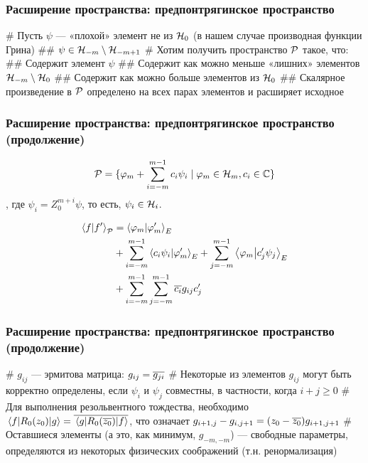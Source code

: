 \documentclass{beamer}
\begin{document}
\begin{frame}[fragile]
\frametitle{Расширение пространства: предпонтрягинское пространство}
\begin{easylist}[itemize]
# Пусть $\psi$ — «плохой» элемент не из $\mathcal{H}_{0}$ (в нашем случае производная функции Грина)
## $\psi \in \mathcal{H}_{-m} \setminus \mathcal{H}_{-m + 1}$ 
# Хотим получить пространство $\mathcal{P}$ такое, что:
## Содержит элемент $\psi$
## Содержит как можно меньше «лишних» элементов $\mathcal{H}_{-m} \setminus \mathcal{H}_{0}$
## Содержит как можно больше элементов из $\mathcal{H}_{0}$
## Скалярное произведение в $\mathcal{P}$ определено на всех парах элементов и расширяет исходное
\end{easylist}
\end{frame}


\begin{frame}[fragile]
\frametitle{Расширение пространства: предпонтрягинское пространство (продолжение)}
\[
\mathcal{P} = 
\{ \varphi_m + \sum\limits_{i = -m}^{m - 1} c_i \psi_i \mid \varphi_m \in \mathcal{H}_{m}, c_i \in \mathbb{C}\}
\]
, где $\psi_i = Z_0^{m + i} \psi$, то есть, $\psi_i \in \mathcal{H}_{i}$.

\begin{align*}
\ip{f}{f'}_{\mcP}
&= \ip{\varphi_m}{\varphi'_m}_E \\
&+ \sum\limits_{i = -m}^{m - 1} \ip{c_i \psi_i}{\varphi'_m}_E + \sum\limits_{j = -m}^{m - 1} \ip{\varphi_m}{c_j' \psi_j}_E \\
&+ \sum\limits_{i = -m}^{m - 1} \sum\limits_{j = -m}^{m - 1} \cconj{c_i} g_{ij} c_j'
\end{align*}
\end{frame}


\begin{frame}[fragile]
\frametitle{Расширение пространства: предпонтрягинское пространство (продолжение)}
\begin{easylist}[itemize]
# $g_{ij}$ — эрмитова матрица: $g_{ij} = \overline{g_{ji}}$
# Некоторые из элементов $g_{ij}$ могут быть корректно определены, если $\psi_i$ и $\psi_j$ совместны, в частности, когда $i + j \ge 0$
# Для выполнения резольвентного тождества, необходимо $\mel{f}{R_0(z_0)}{g} = \overline{\mel{g}{R_0(\overline{z_0})}{f}}$, что означает
$g_{i + 1, j} - g_{i, j + 1} = (z_0 - \overline{z_0}) g_{i + 1, j + 1}$
# Оставшиеся элементы (а это, как минимум, $g_{-m, -m}$) — свободные параметры, определяются из некоторых физических соображений (т.н. ренормализация)
\end{easylist}
\end{frame}
\end{document}
